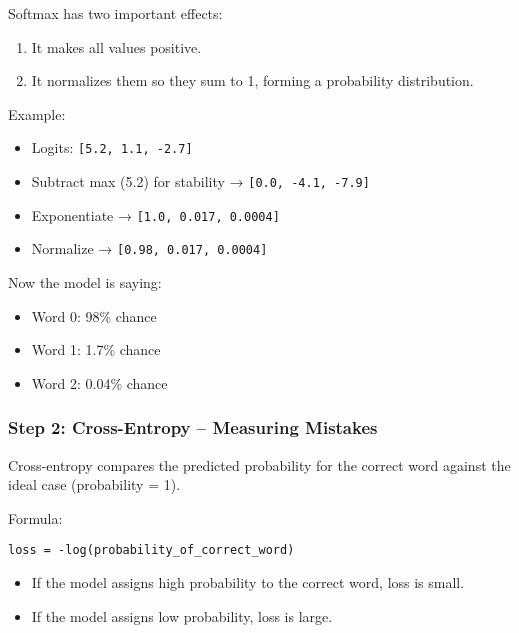 \documentclass[
  letterpaper,
  DIV=11,
  numbers=noendperiod]{scrreprt}
\providecommand{\tightlist}{%
  \setlength{\itemsep}{0pt}\setlength{\parskip}{0pt}}
\begin{document}
Softmax has two important effects:

\begin{enumerate}
\def\labelenumi{\arabic{enumi}.}
\tightlist
\item
  It makes all values positive.
\item
  It normalizes them so they sum to 1, forming a probability
  distribution.
\end{enumerate}

Example:

\begin{itemize}
\tightlist
\item
  Logits: \texttt{{[}5.2,\ 1.1,\ -2.7{]}}
\item
  Subtract max (5.2) for stability → \texttt{{[}0.0,\ -4.1,\ -7.9{]}}
\item
  Exponentiate → \texttt{{[}1.0,\ 0.017,\ 0.0004{]}}
\item
  Normalize → \texttt{{[}0.98,\ 0.017,\ 0.0004{]}}
\end{itemize}

Now the model is saying:

\begin{itemize}
\tightlist
\item
  Word 0: 98\% chance
\item
  Word 1: 1.7\% chance
\item
  Word 2: 0.04\% chance
\end{itemize}

\subsubsection{Step 2: Cross-Entropy -- Measuring
Mistakes}\label{step-2-cross-entropy-measuring-mistakes}

Cross-entropy compares the predicted probability for the correct word
against the ideal case (probability = 1).

Formula:

\begin{verbatim}
loss = -log(probability_of_correct_word)
\end{verbatim}

\begin{itemize}
\tightlist
\item
  If the model assigns high probability to the correct word, loss is
  small.
\item
  If the model assigns low probability, loss is large.
\end{itemize}
\end{document}
